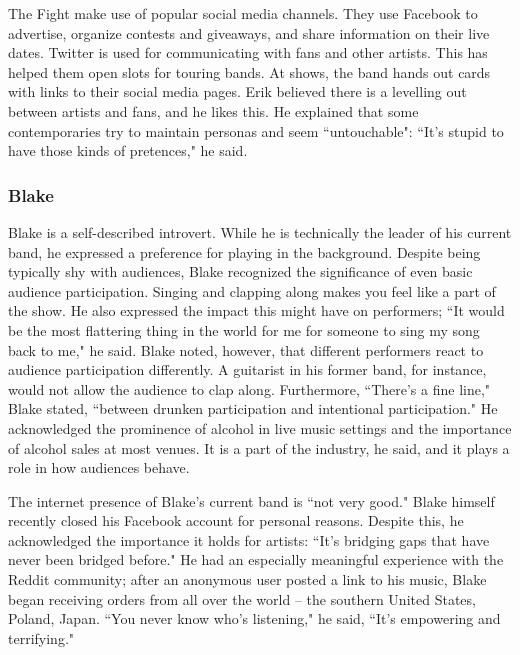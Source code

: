 The Fight make use of popular social media channels. They use Facebook to advertise, organize contests and giveaways, and share information on their live dates. Twitter is used for communicating with fans and other artists. This has helped them open slots for touring bands. At shows, the band hands out cards with links to their social media pages. Erik believed there is a levelling out between artists and fans, and he likes this. He explained that some contemporaries try to maintain personas and seem ``untouchable": ``It's stupid to have those kinds of pretences," he said.

\subsubsection{Blake}
Blake is a self-described introvert. While he is technically the leader of his current band, he expressed a preference for playing in the background. Despite being typically shy with audiences, Blake recognized the significance of even basic audience participation. Singing and clapping along makes you feel like a part of the show. He also expressed the impact this might have on performers; ``It would be the most flattering thing in the world for me for someone to sing my song back to me," he said. Blake noted, however, that different performers react to audience participation differently. A guitarist in his former band, for instance, would not allow the audience to clap along. Furthermore, ``There's a fine line," Blake stated, ``between drunken participation and intentional participation." He acknowledged the prominence of alcohol in live music settings and the importance of alcohol sales at most venues. It is a part of the industry, he said, and it plays a role in how audiences behave.

The internet presence of Blake's current band is ``not very good." Blake himself recently closed his Facebook account for personal reasons. Despite this, he acknowledged the importance it holds for artists: ``It's bridging gaps that have never been bridged before." He had an especially meaningful experience with the Reddit community; after an anonymous user posted a link to his music, Blake began receiving orders from all over the world -- the southern United States, Poland, Japan. ``You never know who's listening," he said, ``It's empowering and terrifying."

